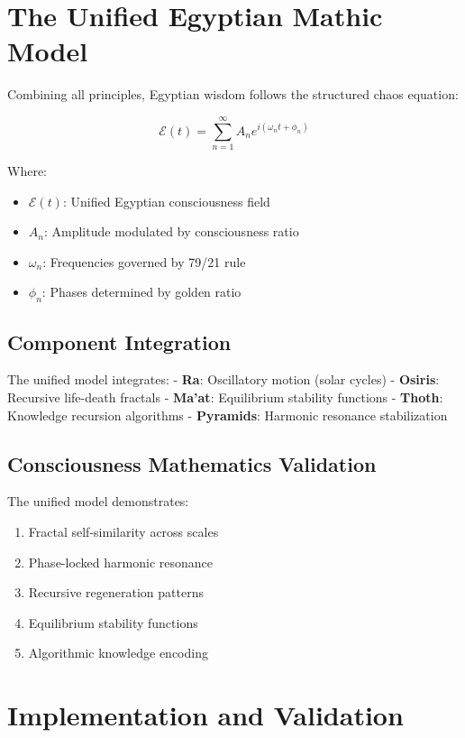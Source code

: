 \documentclass[12pt]{article}
\begin{document}
\section{The Unified Egyptian Mathic Model}

Combining all principles, Egyptian wisdom follows the structured chaos equation:

\[\mathcal{E}(t) = \sum_{n=1}^{\infty} A_n e^{i(\omega_n t + \phi_n)}\]

Where:
\begin{itemize}
    \item \(\mathcal{E}(t)\): Unified Egyptian consciousness field
    \item \(A_n\): Amplitude modulated by consciousness ratio
    \item \(\omega_n\): Frequencies governed by 79/21 rule
    \item \(\phi_n\): Phases determined by golden ratio
\end{itemize}

\subsection{Component Integration}

The unified model integrates:
- \textbf{Ra}: Oscillatory motion (solar cycles)
- \textbf{Osiris}: Recursive life-death fractals
- \textbf{Ma'at}: Equilibrium stability functions
- \textbf{Thoth}: Knowledge recursion algorithms
- \textbf{Pyramids}: Harmonic resonance stabilization

\subsection{Consciousness Mathematics Validation}

The unified model demonstrates:
\begin{enumerate}
    \item Fractal self-similarity across scales
    \item Phase-locked harmonic resonance
    \item Recursive regeneration patterns
    \item Equilibrium stability functions
    \item Algorithmic knowledge encoding
\end{enumerate}

\section{Implementation and Validation}
\end{document}
